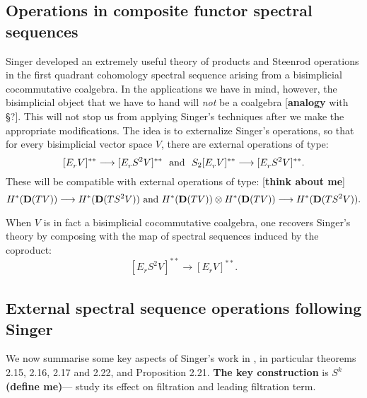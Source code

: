 \documentclass[11pt]{amsart}
\theoremstyle{plain}
\theoremstyle{definition}
\renewcommand{\to}{\longrightarrow}
\theoremstyle{plain}
\newcommand{\E}[5]{[E^{#1}_{#2}#3]^{#4}_{#5}}
\newcommand{\dual}{\mathbf{D}}
\begin{document}
\begin{Operations in composite functor spectral sequences}
\section{\textbf{Operations in composite functor spectral sequences}}\label{Operations in composite functor spectral sequences}
Singer \cite{MR2245560} developed an extremely useful theory of products and Steenrod operations in the first quadrant cohomology spectral sequence arising from a bisimplicial cocommutative coalgebra. In the applications we have in mind, however, the bisimplicial object that we have to hand  will \emph{not} be a coalgebra [\textbf{analogy} with \S?]. This will not stop us from applying Singer's techniques after we make the appropriate modifications. The idea is to externalize Singer's operations, so that for every bisimplicial vector space $V$, there are  external operations of type:
\[\E{}{r}{V}{**}{}\to \E{}{r}{S^2V}{**}{}\textup{ \ and \ }S_2\E{}{r}{V}{**}{}\to \E{}{r}{S^2V}{**}{}.\]
These will be compatible with external operations of type: [\textbf{think about me}]
\[H^*(\dual(TV))\to H^*(\dual(TS^2V))\textup{ and }H^*(\dual(TV))\otimes H^*(\dual(TV))\to H^*(\dual(TS^2V)).\]


When $V$ is  in fact a bisimplicial cocommutative coalgebra, one recovers Singer's theory by composing with the map of spectral sequences induced by the coproduct:
\[\E{}{r}{S^2V}{**}{}\to \E{}{r}{V}{**}{}.\]
\subsection{External spectral sequence operations following Singer}
We now summarise some key aspects of Singer's work in \cite{MR2245560}, in particular theorems 2.15, 2.16, 2.17 and 2.22, and Proposition 2.21. \textbf{The key construction} is $S^k$ \textbf{(define me)}--- study its effect on filtration and leading filtration term.


\end{Operations in composite functor spectral sequences}
\end{document}
